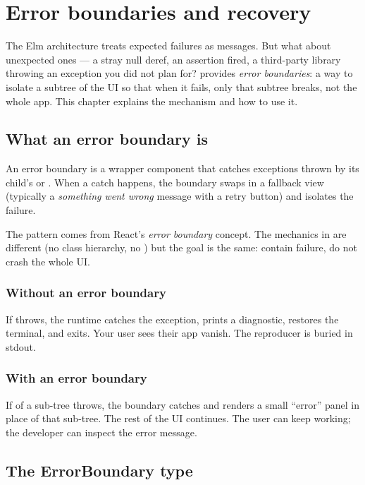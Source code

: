 \chapter{Error boundaries and recovery}
\label{ch:errorboundary}

\begin{aside}
The Elm architecture treats expected failures as messages. But
what about unexpected ones --- a stray null deref, an assertion
fired, a third-party library throwing an exception you did not
plan for? \maya{} provides \emph{error boundaries}: a way to
isolate a subtree of the UI so that when it fails, only that
subtree breaks, not the whole app. This chapter explains the
mechanism and how to use it.
\end{aside}

\section{What an error boundary is}

An error boundary is a wrapper component that catches exceptions
thrown by its child's  or . When a
catch happens, the boundary swaps in a fallback view (typically a
\emph{something went wrong} message with a retry button) and
isolates the failure.

The pattern comes from React's \emph{error boundary} concept.
The mechanics in \maya{} are different (no class hierarchy, no
) but the goal is the same: contain
failure, do not crash the whole UI.

\subsection*{Without an error boundary}

If  throws, the runtime catches the exception, prints
a diagnostic, restores the terminal, and exits. Your user sees
their app vanish. The reproducer is buried in stdout.

\subsection*{With an error boundary}

If  of a sub-tree throws, the boundary catches and
renders a small ``error'' panel in place of that sub-tree. The
rest of the UI continues. The user can keep working; the developer
can inspect the error message.

\section{The ErrorBoundary type}

